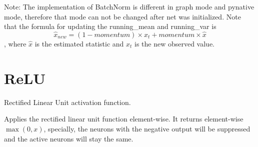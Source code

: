 \documentclass{article}
\begin{document}
    Note:
        The implementation of BatchNorm is different in graph mode and pynative mode, therefore that mode can not be
        changed after net was initialized.
        Note that the formula for updating the running\_mean and running\_var is
        $$\hat{x}_ {new} = (1 -   momentum) \times x_t +   momentum \times \hat{x}$$,
        where $\hat{x}$ is the estimated statistic and $x_t$ is the new observed value.
\section{ReLU}
Rectified Linear Unit activation function.

Applies the rectified linear unit function element-wise. It returns
element-wise $\max(0, x)$, specially, the neurons with the negative output
will be suppressed and the active neurons will stay the same.
\end{document}

